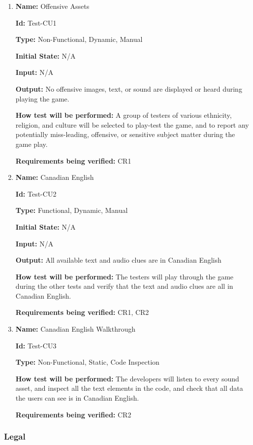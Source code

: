 \documentclass[12pt, titlepage]{article}
\begin{document}
\begin{enumerate}

\item{\textbf{Name:} Offensive Assets}

\textbf{Id:} Test-CU1

\textbf{Type:} Non-Functional, Dynamic, Manual
					
\textbf{Initial State:} N/A
					
\textbf{Input:} N/A
					
\textbf{Output:} No offensive images, text, or sound are displayed or heard during playing the game.
					
\textbf{How test will be performed:} A group of testers of various ethnicity, religion, and culture will be selected to play-test the game, and to report any potentially miss-leading, offensive, or sensitive subject matter during the game play.  

\textbf{Requirements being verified:} CR1
					
\item{\textbf{Name:} Canadian English}

\textbf{Id:} Test-CU2

\textbf{Type:} Functional, Dynamic, Manual
					
\textbf{Initial State:} N/A
					
\textbf{Input:} N/A
					
\textbf{Output:} All available text and audio clues are in Canadian English
					
\textbf{How test will be performed:} The testers will play through the game during the other tests and verify that the text and audio clues are all in Canadian English. 

\textbf{Requirements being verified:} CR1, CR2

\item{\textbf{Name:} Canadian English Walkthrough}

\textbf{Id:} Test-CU3

\textbf{Type:} Non-Functional, Static, Code Inspection
									
\textbf{How test will be performed:} The developers will listen to every sound asset, and inspect all the text elements in the code, and check that all data the users can see is in Canadian English.

\textbf{Requirements being verified:} CR2

\end{enumerate}

\subsubsection{Legal}
\end{document}
